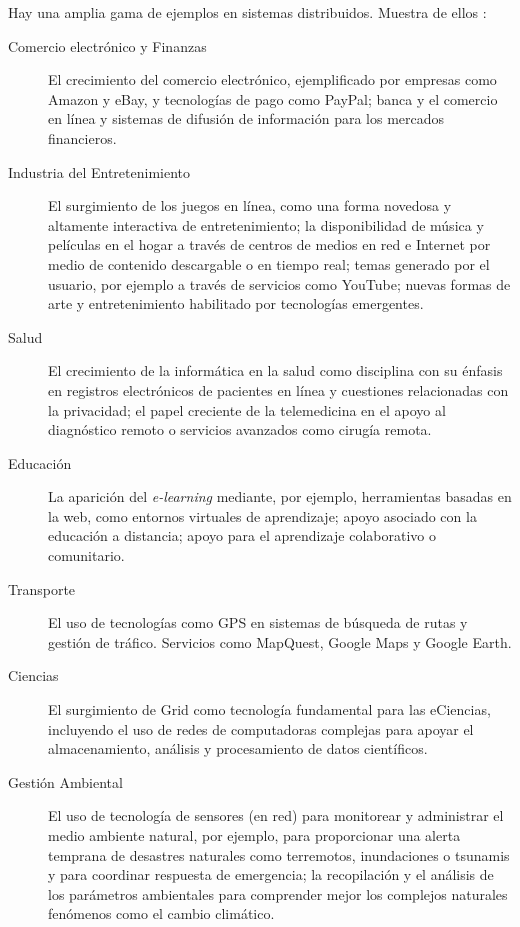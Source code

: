 Hay una amplia gama de ejemplos en sistemas distribuidos. Muestra de ellos : 
\begin{description}
	\item[{Comercio electrónico y Finanzas}] 
	El crecimiento del comercio electrónico, ejemplificado por empresas como Amazon y eBay, y tecnologías de pago como PayPal;  banca y el comercio en línea y sistemas de difusión de información para los mercados financieros.
 	
	\item[{ Industria del Entretenimiento}]  
	El surgimiento de los juegos en línea,  como una forma novedosa y altamente interactiva de entretenimiento; la disponibilidad de música y películas en el hogar  a través de centros de medios en red e Internet por medio de contenido descargable o en tiempo real;  temas generado por el usuario, por ejemplo a través de servicios como YouTube; nuevas formas de arte y entretenimiento habilitado por tecnologías emergentes.
		
	\item[{Salud}]  
	El crecimiento de la informática en la salud  como disciplina con su énfasis en 	registros electrónicos de pacientes en l\'inea y cuestiones relacionadas con la privacidad; el papel creciente de la telemedicina en el apoyo al diagn\'ostico remoto o 	servicios avanzados como cirug\'ia remota.
		
	\item[{Educación}]  
	La aparici\'on del  \textit{e-learning}  mediante, por ejemplo, herramientas basadas en la web,	como entornos virtuales de aprendizaje; apoyo asociado con la educación a distancia; apoyo para el aprendizaje colaborativo o comunitario.
	
	\item[{Transporte}] El uso de tecnologías  como GPS en sistemas de búsqueda de rutas y gestión de tráfico. Servicios como MapQuest, Google Maps y Google Earth. 
	
	\item [{ Ciencias}] 
	El surgimiento de Grid como tecnología fundamental para las eCiencias, 	incluyendo el uso de  redes de computadoras complejas para apoyar el 	almacenamiento, análisis y procesamiento de datos científicos.
	
	\item[ { Gestión Ambiental }] El uso de tecnología de sensores (en red) para monitorear y administrar el medio ambiente natural, por ejemplo, para proporcionar una alerta temprana de desastres naturales como terremotos, inundaciones o tsunamis y para coordinar respuesta de emergencia; la recopilación y el análisis de los parámetros ambientales para comprender mejor los complejos naturales 	fenómenos como el cambio climático. 
			
\end{description}


